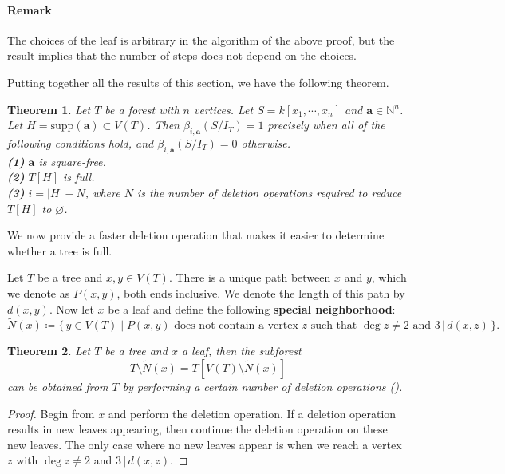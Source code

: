 \documentclass[dvipsnames,10pt]{article}
\newtheorem{theorem}{Theorem}[section]
\begin{document}
\paragraph*{Remark} The choices of the leaf is arbitrary in the algorithm of the above proof, but the result implies that the number of steps does not depend on the choices.

Putting together all the results of this section, we have the following theorem.

\begin{theorem}
    Let $T$ be a forest with $n$ vertices. Let $S=k[x_1,\cdots,x_n]$ and $\mathbf{a}\in\mathbb{N}^n$. Let $H=\mathrm{supp}(\mathbf{a})\subset V(T)$. Then $\beta_{i,\mathbf{a}}(S/I_T)=1$ precisely when all of the following conditions hold, and $\beta_{i,\mathbf{a}}(S/I_T)=0$ otherwise.\\
    \textbf{(1)} $\mathbf{a}$ is square-free.\\
    \textbf{(2)} $T[H]$ is full.\\
    \textbf{(3)} $i=|H|-N$, where $N$ is the number of deletion operations required to reduce $T[H]$ to $\varnothing$.
\end{theorem}

We now provide a faster deletion operation that makes it easier to determine whether a tree is full.

Let $T$ be a tree and $x,y\in V(T)$. There is a unique path between $x$ and $y$, which we denote as $P(x,y)$, both ends inclusive. We denote the length of this path by $d(x,y)$. Now let $x$ be a leaf and define the following \textbf{special neighborhood}:
\begin{equation*}
    \tilde{N}(x) \coloneq \{\,y\in V(T)\mid P(x,y)\text{ does not contain a vertex }z\text{ such that }\deg z \neq 2\text{ and }3\,|\,d(x,z)\,\}.
\end{equation*}

\begin{theorem}
    Let $T$ be a tree and $x$ a leaf, then the subforest
    \begin{equation*}
        T\setminus \tilde{N}(x) = T[V(T)\setminus \tilde{N}(x)]
    \end{equation*}
    can be obtained from $T$ by performing a certain number of deletion operations ().
\end{theorem}

\begin{proof}
    Begin from $x$ and perform the deletion operation. If a deletion operation results in new leaves appearing, then continue the deletion operation on these new leaves. The only case where no new leaves appear is when we reach a vertex $z$ with $\deg z\neq 2$ and $3\,|\,d(x,z)$.
\end{proof}
\end{document}
